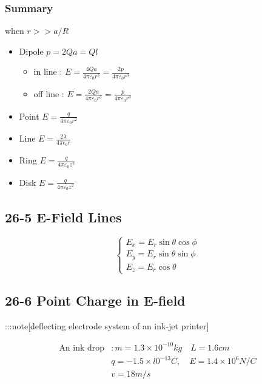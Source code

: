 \documentclass[
]{article}
\providecommand{\tightlist}{%
  \setlength{\itemsep}{0pt}\setlength{\parskip}{0pt}}
\begin{document}
\hypertarget{summary}{%
\subsubsection{Summary}\label{summary}}

when \(r>>a/R\)

\begin{itemize}
\item
  Dipole \(p=2Qa=Ql\)

  \begin{itemize}
  \tightlist
  \item
    in line :
    \(E=\frac{4Qa}{4\pi \varepsilon_0 r^3 }=\frac{2p}{4\pi \varepsilon _0r^3}\)
  \item
    off line :
    \(E=\frac{2Qa}{4\pi \varepsilon _0r^3}=\frac{p}{4\pi \varepsilon _0r^3}\)
  \end{itemize}
\item
  Point \(E=\frac{q}{4\pi \varepsilon_0 r^2 }\)
\item
  Line \(E=\frac{2\lambda }{4\pi \epsilon_0 r}\)
\item
  Ring \(E=\frac{q}{4\pi \varepsilon _0z^2}\)
\item
  Disk \(E=\frac{q}{4\pi \varepsilon _0z^2}\)
\end{itemize}

\hypertarget{e-field-lines}{%
\subsection{26-5 E-Field Lines}\label{e-field-lines}}

\[
\begin{cases}E_x=E_r\sin\theta\cos\phi\\E_y=E_r\sin\theta\sin\phi\\E_z=E_r\cos\theta\end{cases}
\]

\hypertarget{point-charge-in-e-field}{%
\subsection{26-6 Point Charge in
E-field}\label{point-charge-in-e-field}}

:::note{[}deflecting electrode system of an ink-jet printer{]}

\[
\begin{aligned}\text{An ink drop}&:m=1.3\times 10^{-10}kg\quad L=1.6cm\\&q=-1.5\times l0^{-13}C,\quad E=1.4\times 10^6N/C\\&v=18m/s\end{aligned}
\]
\end{document}
